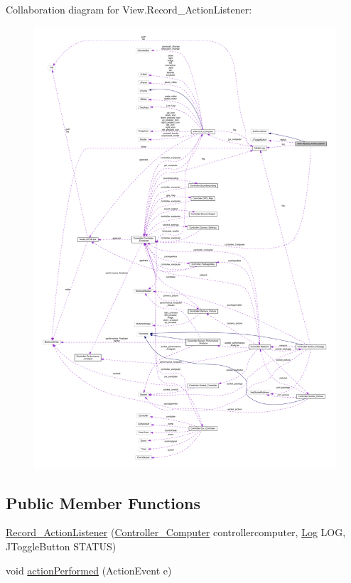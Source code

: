 Collaboration diagram for View.\+Record\+\_\+\+Action\+Listener\+:
\nopagebreak
\begin{figure}[H]
\begin{center}
\leavevmode
\includegraphics[width=350pt]{class_view_1_1_record___action_listener__coll__graph}
\end{center}
\end{figure}
\subsection*{Public Member Functions}
\begin{DoxyCompactItemize}
\item 
\hyperlink{class_view_1_1_record___action_listener_a8e908efa77c11833fdf162afd4a1b8ad}{Record\+\_\+\+Action\+Listener} (\hyperlink{class_controller_1_1_controller___computer}{Controller\+\_\+\+Computer} controllercomputer, \hyperlink{class_model_1_1_log}{Log} L\+O\+G, J\+Toggle\+Button S\+T\+A\+T\+U\+S)
\item 
void \hyperlink{class_view_1_1_record___action_listener_a7228441e16e7040dc285c185c49199ed}{action\+Performed} (Action\+Event e)
\end{DoxyCompactItemize}


